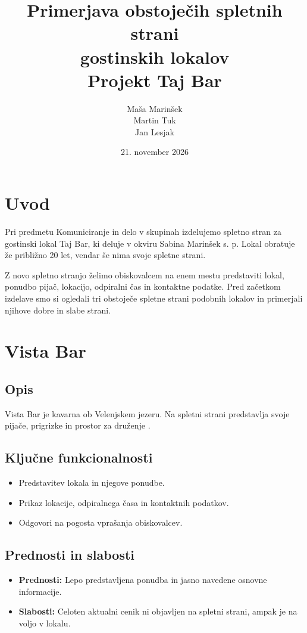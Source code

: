 \documentclass[a4paper,11pt]{article}
\title{Primerjava obstoječih spletnih strani\\gostinskih lokalov\\[0.4cm]Projekt Taj Bar}
\author{Maša Marinšek \\ Martin Tuk \\ Jan Lesjak}
\date{21. november 2026}
\begin{document}
\maketitle
\tableofcontents
\clearpage

\section{Uvod}
Pri predmetu Komuniciranje in delo v skupinah izdelujemo spletno stran za gostinski lokal Taj Bar, ki deluje v okviru Sabina Marinšek s. p. Lokal obratuje že približno 20 let, vendar še nima svoje spletne strani.

Z novo spletno stranjo želimo obiskovalcem na enem mestu predstaviti lokal, ponudbo pijač, lokacijo, odpiralni čas in kontaktne podatke. Pred začetkom izdelave smo si ogledali tri obstoječe spletne strani podobnih lokalov in primerjali njihove dobre in slabe strani.

\section{Vista Bar}
\subsection{Opis}
Vista Bar je kavarna ob Velenjskem jezeru. Na spletni strani predstavlja svoje pijače, prigrizke in prostor za druženje \cite{vista}.

\subsection{Ključne funkcionalnosti}
\begin{itemize}
    \item Predstavitev lokala in njegove ponudbe.
    \item Prikaz lokacije, odpiralnega časa in kontaktnih podatkov.
    \item Odgovori na pogosta vprašanja obiskovalcev.
\end{itemize}

\subsection{Prednosti in slabosti}
\begin{itemize}
    \item \textbf{Prednosti:} Lepo predstavljena ponudba in jasno navedene osnovne informacije.
    \item \textbf{Slabosti:} Celoten aktualni cenik ni objavljen na spletni strani, ampak je na voljo v lokalu.
\end{itemize}
\end{document}
